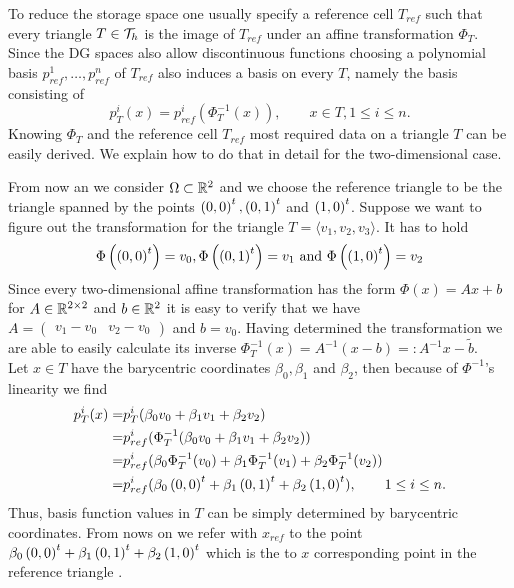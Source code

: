 To reduce the storage space one usually specify a reference cell $T_{ref}$ such that every triangle $T \in \mathcal{T}_h$ is the image of $T_{ref}$ under an affine transformation $\Phi_T$. 
Since the DG spaces also allow discontinuous functions choosing a polynomial basis $p^1_{ref},\dots,p^n_{ref}$ of $T_{ref}$ also induces a basis on every $T$, namely the basis consisting of 
\[
	p_T^i(x) = p^i_{ref}(\Phi_T^{-1}(x)), \qquad x \in T, 1 \leq i \leq n.
\]
Knowing $\Phi_T$ and the reference cell $T_{ref}$ most required data on a triangle $T$ can be easily derived. We explain how to do that in detail for the two-dimensional case.

\begin{example}
From now an we consider $\Omega \subset \mathbb{R}^2$ and we choose the reference triangle to be the triangle spanned by the points $\left( 0, 0\right)^t, \left( 0, 1\right)^t$ and $\left( 1, 0\right)^t$.
Suppose we want to figure out the transformation for the triangle $T = \langle v_1,v_2,v_3 \rangle$.
It has to hold
\[
\Phi\left(\left( 0, 0\right)^t\right) = v_0, \Phi\left(\left( 0, 1\right)^t\right) = v_1 \textnormal{ and } \Phi\left(\left( 1, 0\right)^t\right) = v_2
\]
Since every two-dimensional affine transformation has the form $\Phi(x) = Ax+b$ for $A \in \mathbb{R}^{2 \times 2}$ and $b \in \mathbb{R}^2$ it is easy to verify that we have $A = \begin{pmatrix} v_1-v_0 & v_2-v_0\end{pmatrix}$ and $b = v_0$.
Having determined the transformation we are able to easily calculate its inverse $\Phi_T^{-1}(x) = A^{-1} (x-b) =: A^{-1} x- \tilde b$. \\
Let $x \in T$ have the barycentric coordinates $\beta_0, \beta_1$ and $\beta_2$, then because of $\Phi^{-1}$'s linearity we find
\begin{align*}
	p^i_T(x) =& p_T^i( \beta_0 v_0 +\beta_1 v_1 + \beta_2 v_2  ) \\
	=& p^i_{ref}(\Phi_T^{-1}(\beta_0 v_0 +\beta_1 v_1 + \beta_2 v_2)) \\
	=& p^i_{ref}(\beta_0 \Phi_T^{-1}(v_0) +\beta_1 \Phi_T^{-1}(v_1) + \beta_2 \Phi_T^{-1}(v_2)) \\
		=& p^i_{ref}(\beta_0 \left( 0, 0\right)^t +\beta_1 \left( 0, 1\right)^t + \beta_2 \left( 1, 0\right)^t ), \qquad 1 \leq i \leq n.
\end{align*}
Thus, basis function values in $T$ can be simply determined by barycentric coordinates. From nows on we refer with $x_{ref}$  to the point $\beta_0 \left( 0, 0\right)^t +\beta_1 \left( 0, 1\right)^t + \beta_2 \left( 1, 0\right)^t$ which is the to $x$ corresponding point in the reference triangle .


\end{example}
